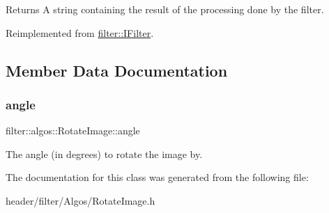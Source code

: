 \begin{DoxyReturn}{Returns}
A string containing the result of the processing done by the filter. 
\end{DoxyReturn}


Reimplemented from \hyperlink{classfilter_1_1_i_filter_ab99902b060a6d9edc3452a8c9f85e37e}{filter\+::\+I\+Filter}.



\subsection{Member Data Documentation}
\mbox{\label{classfilter_1_1algos_1_1_rotate_image_ae815c8d88eae42fcf231b6d5540ecbf3}} 
\subsubsection{\texorpdfstring{angle}{angle}}
{\footnotesize\ttfamily filter\+::algos\+::\+Rotate\+Image\+::angle}

The angle (in degrees) to rotate the image by. 

The documentation for this class was generated from the following file\+:\begin{DoxyCompactItemize}
\item 
header/filter/\+Algos/Rotate\+Image.\+h\end{DoxyCompactItemize}
